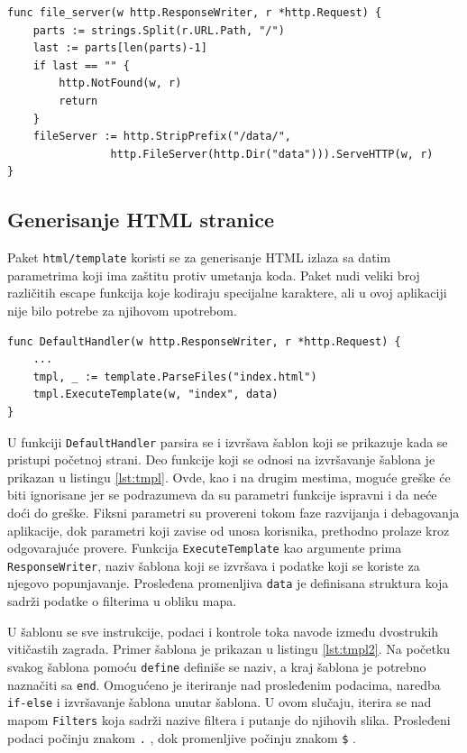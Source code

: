 \documentclass[12pt,oneside]{memoir}
\begin{document}
\begin{center}
\begin{lstlisting}[caption=Hendler za sistem datoteka,label={lst:fileserver},  backgroundcolor=\color{background}]
func file_server(w http.ResponseWriter, r *http.Request) {
	parts := strings.Split(r.URL.Path, "/")
	last := parts[len(parts)-1]
	if last == "" {
		http.NotFound(w, r)
		return
	}
	fileServer := http.StripPrefix("/data/", 
				http.FileServer(http.Dir("data"))).ServeHTTP(w, r)
}
\end{lstlisting}
\end{center}

\subsection{Generisanje HTML stranice}

Paket \texttt{html/template} koristi se za generisanje HTML izlaza sa datim parametrima koji ima zaštitu protiv umetanja koda. Paket nudi veliki broj različitih escape funkcija koje kodiraju specijalne karaktere, ali u ovoj aplikaciji nije bilo potrebe za njihovom upotrebom. 

\begin{center}
\begin{lstlisting}[caption=Izvršavanje HTML šablona,label={lst:tmpl},  backgroundcolor=\color{background}]
func DefaultHandler(w http.ResponseWriter, r *http.Request) {
	...
	tmpl, _ := template.ParseFiles("index.html")
	tmpl.ExecuteTemplate(w, "index", data)
}
\end{lstlisting}
\end{center}

U funkciji \texttt{DefaultHandler} parsira se i izvršava šablon koji se prikazuje kada se pristupi početnoj strani. Deo funkcije koji se odnosi na izvršavanje šablona je prikazan u listingu \ref{lst:tmpl}. Ovde, kao i na drugim mestima, moguće greške će biti ignorisane jer se podrazumeva da su parametri funkcije ispravni i da neće doći do greške. Fiksni parametri su provereni tokom faze razvijanja i debagovanja aplikacije, dok parametri koji zavise od unosa korisnika, prethodno prolaze kroz odgovarajuće provere. Funkcija \texttt{ExecuteTemplate} kao argumente prima \texttt{ResponseWriter}, naziv šablona koji se izvršava i podatke koji se koriste za njegovo popunjavanje. Prosleđena promenljiva \texttt{data} je definisana struktura koja sadrži podatke o filterima u obliku mapa.

U šablonu se sve instrukcije, podaci i kontrole toka navode između dvostrukih vitičastih zagrada. Primer šablona je prikazan u listingu \ref{lst:tmpl2}. Na početku svakog šablona pomoću \texttt{define} definiše se naziv, a kraj šablona je potrebno naznačiti sa \texttt{end}. Omogućeno je iteriranje nad prosleđenim podacima, naredba \texttt{if-else} i izvršavanje šablona unutar šablona. U ovom slučaju, iterira se nad mapom \texttt{Filters} koja sadrži nazive filtera i putanje do njihovih slika. Prosleđeni podaci počinju znakom \texttt{.} , dok promenljive počinju znakom \texttt{\$} \cite{template}.
\end{document}
